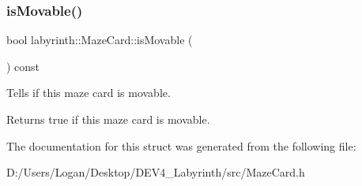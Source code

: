 \subsubsection{\texorpdfstring{isMovable()}{isMovable()}}
{\footnotesize\ttfamily bool labyrinth\+::\+Maze\+Card\+::is\+Movable (\begin{DoxyParamCaption}{ }\end{DoxyParamCaption}) const\hspace{0.3cm}{\ttfamily [inline]}}



Tells if this maze card is movable. 

\begin{DoxyReturn}{Returns}
true if this maze card is movable. 
\end{DoxyReturn}


The documentation for this struct was generated from the following file\+:\begin{DoxyCompactItemize}
\item 
D\+:/\+Users/\+Logan/\+Desktop/\+D\+E\+V4\+\_\+\+Labyrinth/src/Maze\+Card.\+h\end{DoxyCompactItemize}

